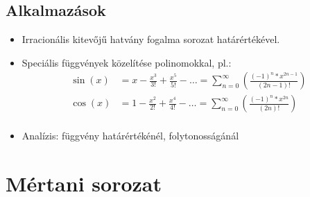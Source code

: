 \documentclass[twoside,12pt]{report}
\theoremstyle{definition}
\begin{document}
\section{Alkalmazások}
	\begin{itemize}
		\item Irracionális kitevőjű hatvány fogalma sorozat határértékével.
		\item Speciális függvények közelítése polinomokkal, pl.:
		\begin{align*}
			\sin(x)&=x-\frac{x^3}{3!}+\frac{x^5}{5!}-\dots=\sum_{n=0}^{\infty} \left(\frac{(-1)^n*x^{2n-1}}{(2n-1)!}\right)\\
			\cos(x)&=1-\frac{x^2}{2!}+\frac{x^4}{4!}-\dots=\sum_{n=0}^{\infty} \left(\frac{(-1)^n*x^{2n}}{(2n)!}\right)\\
		\end{align*}
		\item Analízis: függvény határértékénél, folytonosságánál
	\end{itemize}
\chapter{Mértani sorozat}
\end{document}
